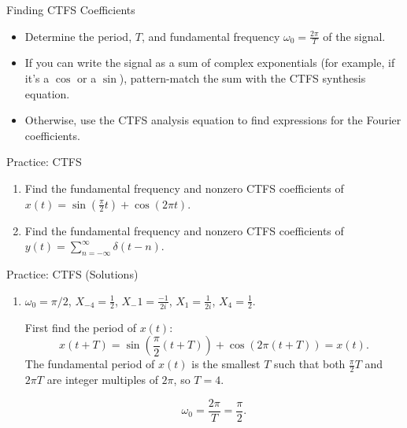 \begin{frame}{Finding CTFS Coefficients}
    \begin{itemize}
        \item Determine the period, $T$, and fundamental frequency $\omega_0 = \frac{2\pi}{T}$ of the signal.
        \item If you can write the signal as a sum of complex exponentials (for example, if it's a $\cos$ or a $\sin$), pattern-match the sum with the CTFS synthesis equation.
        \item Otherwise, use the CTFS analysis equation to find expressions for the Fourier coefficients.
    \end{itemize}
\end{frame}

\begin{frame}{Practice: CTFS}
    \begin{enumerate}
        \item Find the fundamental frequency and nonzero CTFS coefficients of $x(t) = \sin(\frac{\pi}{2}t) + \cos(2\pi t)$.
        \item Find the fundamental frequency and nonzero CTFS coefficients of $y(t) = \sum_{n = -\infty}^\infty \delta(t - n)$.
    \end{enumerate}
\end{frame}

\begin{frame}{Practice: CTFS (Solutions)}
    \begin{enumerate}
        \item {\color{red} $\omega_0 = \pi / 2$, $X_{-4} = \frac{1}{2}$, $X_-1 = \frac{-1}{2i}$, $X_1 = \frac{1}{2i}$, $X_4 = \frac{1}{2}$.} \\
        
        {\color{blue}
        \noindent First find the period of $x(t)$:
        $$x(t + T) = \sin(\frac{\pi}{2}(t + T)) + \cos(2\pi (t + T)) = x(t).$$
        The fundamental period of $x(t)$ is the smallest $T$ such that both $\frac{\pi}{2}T$ and $2\pi T$ are integer multiples of $2\pi$, so $T = 4$.

        $$\omega_0 = \frac{2\pi}{T} = \frac{\pi}{2}.$$
        }
    \end{enumerate}
\end{frame}


